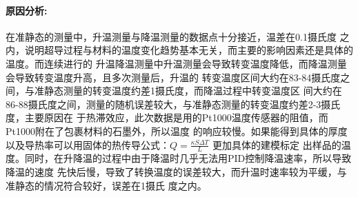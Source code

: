 \documentclass{ctexart}
\theoremstyle{ansstyle}
\begin{document}
\paragraph[short]{原因分析:}
在准静态的测量中，升温测量与降温测量的数据点十分接近，温差在0.1摄氏度
之内，说明超导过程与材料的温度变化趋势基本无关，而主要的影响因素还是具体的温度。而连续进行的
升温降温测量中升温测量会导致转变温度降低，而降温测量会导致转变温度升高，且多次测量后，升温的
转变温度区间大约在83-84摄氏度之间，与准静态测量的转变温度约差1摄氏度，而降温过程中转变温度区
间大约在86-88摄氏度之间，测量的随机误差较大，与准静态测量的转变温度约差2-3摄氏度，主要原因在
于热滞效应，此次数据是用的Pt1000温度传感器的阻值，而Pt1000附在了包裹材料的石墨外，所以温度
的响应较慢。如果能得到具体的厚度以及导热率可以用固体的热传导公式：$Q =\frac{\kappa S \Delta T}{L} $ 更加具体的建模标定
出样品的温度。同时，在升降温的过程中由于降温时几乎无法用PID控制降温速率，所以导致降温的速度
先快后慢，导致了转换温度的误差较大，而升温时速率较为平缓，与准静态的情况符合较好，误差在1摄氏
度之内。
\end{document}
